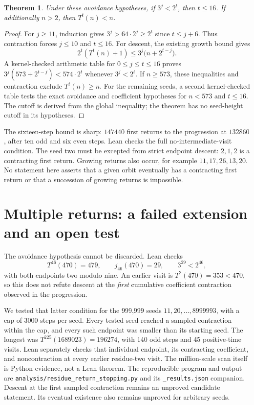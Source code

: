\documentclass[10pt]{article}
\newtheorem{theorem}{Theorem}
\begin{document}
\begin{theorem}
Under these avoidance hypotheses, if $3^j<2^t$, then $t\leq16$.
If additionally $n>2$, then $T^t(n)<n$.
\end{theorem}
\begin{proof}
For $j\geq11$, induction gives $3^j>64\cdot2^j\geq2^t$ since
$t\leq j+6$. Thus contraction forces $j\leq10$ and $t\leq16$.
For descent, the existing growth bound gives
\[
2^t(T^t(n)+1)\leq3^j\bigl(n+2^{t-j}\bigr).
\]
A kernel-checked arithmetic table for $0\leq j\leq t\leq16$ proves
$3^j(573+2^{t-j})<574\cdot2^t$ whenever $3^j<2^t$.
If $n\geq573$, these inequalities and contraction exclude $T^t(n)\geq n$.
For the remaining seeds, a second kernel-checked table tests the exact
avoidance and coefficient hypotheses for $n<573$ and $t\leq16$.
The cutoff is derived from the global inequality; the theorem has no
seed-height cutoff in its hypotheses.
\end{proof}
The sixteen-step bound is sharp: $147440$ first returns to the progression
at $132860$, after ten odd and six even steps. Lean checks the full
no-intermediate-visit condition. The seed two must be excepted from strict
endpoint descent: $2,1,2$ is a contracting first return.
Growing returns also occur, for example $11,17,26,13,20$.
No statement here asserts that a given orbit eventually has a contracting
first return or that a succession of growing returns is impossible.

\section*{Multiple returns: a failed extension and an open test}
The avoidance hypothesis cannot be discarded. Lean checks
\[
T^{46}(470)=479,\qquad j_{46}(470)=29,\qquad 3^{29}<2^{46},
\]
with both endpoints two modulo nine. An earlier visit is
$T^2(470)=353<470$, so this does not refute descent at the \emph{first}
cumulative coefficient contraction observed in the progression.

We tested that latter condition for the 999,999 seeds
$11,20,\ldots,8999993$, with a cap of 3000 steps per seed.
Every tested seed reached a sampled contraction within the cap, and every
such endpoint was smaller than its starting seed. The longest was
$T^{225}(1689023)=196274$, with 140 odd steps and 45 positive-time visits.
Lean separately checks that individual endpoint, its contracting
coefficient, and noncontraction at every earlier residue-two visit.
The million-scale scan itself is Python evidence, not a Lean theorem.
The reproducible program and output are
\texttt{analysis/residue\_return\_stopping.py} and its
\texttt{\_results.json} companion. Descent at the first sampled contraction
remains an unproved candidate statement. Its eventual existence also
remains unproved for arbitrary seeds.
\end{document}
